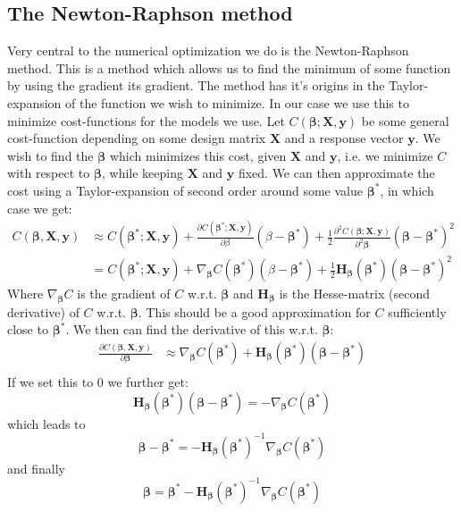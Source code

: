 \documentclass{article}
\begin{document}
\subsection{The Newton-Raphson method}
Very central to the numerical optimization we do is the Newton-Raphson method.
This is a method which allows us to find the minimum of some function by using
the gradient its gradient. The method has it's origins in the Taylor-expansion
of the function we wish to minimize. In our case we use this to minimize
cost-functions for the models we use. Let $C(\bm{\beta}; \bm{X}, \bm{y})$ be
some general cost-function depending on some design matrix $\bm{X}$ and a
response vector $\bm{y}$. We wish to find the $\bm{\beta}$ which minimizes this
cost, given $\bm{X}$ and $\bm{y}$, i.e. we minimize $C$ with respect to
$\bm{\beta}$, while keeping $\bm{X}$ and $\bm{y}$ fixed. We can then approximate
the cost using a Taylor-expansion of second order around some value
$\bm{\beta}^*$, in which case we get:
\begin{align*}
    C(\bm{\beta}, \bm{X}, \bm{y}) & \approx C(\bm{\beta}^*; \bm{X}, \bm{y}) + \frac{\partial C(\bm{\beta}^*; \bm{X}, \bm{y})}{\partial \beta}(\beta - \bm{\beta}^*) + \frac{1}{2} \frac{\partial^2 C(\bm{\beta}; \bm{X}, \bm{y})}{\partial^2 \bm{\beta}}(\bm{\beta} - \bm{\beta}^*)^2 \\
                                  & = C(\bm{\beta}^*; \bm{X}, \bm{y}) + \nabla_{\bm{\beta}} C(\bm{\beta}^*) (\beta - \bm{\beta}^*) + \frac{1}{2} \bm{H}_{\bm{\beta}}(\bm{\beta}^*) (\bm{\beta} - \bm{\beta}^*)^2
\end{align*}
Where $\nabla_{\bm{\beta}} C$ is the gradient of $C$ w.r.t. $\bm{\beta}$ and
$\bm{H}_{\bm{\beta}}$ is the Hesse-matrix (second derivative) of $C$ w.r.t.
$\bm{\beta}$. This should be a good approximation for $C$ sufficiently close to
$\bm{\beta}^*$. We then can find the derivative of this w.r.t. $\bm{\beta}$:
\begin{align*}
    \frac{\partial C(\bm{\beta}, \bm{X}, \bm{y})}{\partial \bm{\beta}} & \approx
    \nabla_{\bm{\beta}} C(\bm{\beta}^*) + \bm{H}_{\bm{\beta}}(\bm{\beta}^*)(\bm{\beta} - \bm{\beta}^*) \\
\end{align*}
If we set this to $0$ we further get:
$$\bm{H}_{\bm{\beta}}(\bm{\beta}^*) (\bm{\beta} - \bm{\beta}^*) = -\nabla_{\bm{\beta}} C(\bm{\beta}^*)$$
which leads to
$$\bm{\beta} - \bm{\beta}^* = - \bm{H}_{\bm{\beta}}(\bm{\beta}^*)^{-1} \nabla_{\bm{\beta}} C(\bm{\beta}^*)$$
and finally
$$\bm{\beta} = \bm{\beta}^* - \bm{H}_{\bm{\beta}}(\bm{\beta}^*)^{-1} \nabla_{\bm{\beta}} C(\bm{\beta}^*)$$
\end{document}
